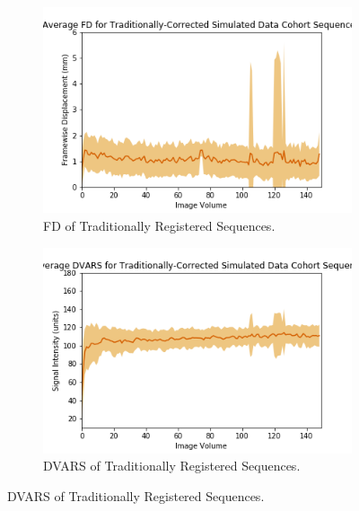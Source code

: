 \begin{figure}
	\begin{subfigure}{0.4\textwidth}
		\centering
		\includegraphics[width=1.0\textwidth]{6/figures/spectr-trad-fd-150.png}
		\caption{FD of Traditionally Registered Sequences.}
	\end{subfigure}
	\hspace{0.05\textwidth}
	\begin{subfigure}{0.4\textwidth}
		\centering
		\includegraphics[width=1.0\textwidth]{6/figures/spectr-trad-dvars-150.png}
		\caption{DVARS of Traditionally Registered Sequences.}
	\end{subfigure}
	

\end{figure}
